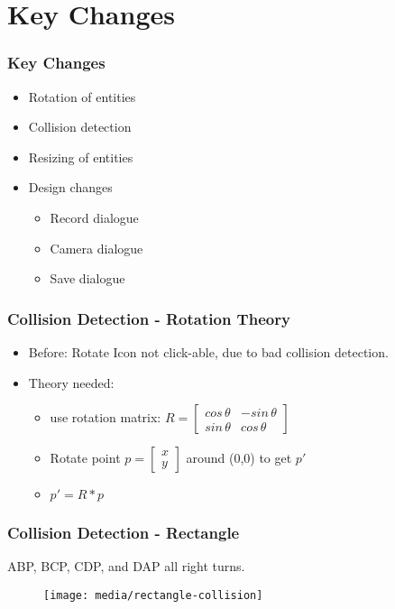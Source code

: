 

\section{Key Changes}
\begin{frame}
	\frametitle{Key Changes}
	\begin{itemize}
		\item Rotation of entities
		\item Collision detection
		\item Resizing of entities
		\item Design changes
		\begin{itemize}
			\item Record dialogue
			\item Camera dialogue
			\item Save dialogue
		\end{itemize}
	\end{itemize}
\end{frame}

\begin{frame}
	\frametitle{Collision Detection - Rotation Theory}
	\begin{itemize}
	\item Before: Rotate Icon not click-able, due to bad collision detection.
	\item Theory needed: 
	\begin{itemize}
	\item use rotation matrix: $R = \begin{bmatrix}
			cos\, \theta & - sin\, \theta\\
			sin\, \theta & cos\, \theta
			\end{bmatrix}$
	\item Rotate point $p = \begin{bmatrix}x\\y\end{bmatrix}$ around (0,0) to get $p'$
	\item $p' = R*p$
	\end{itemize}
	\end{itemize}
\end{frame}



\begin{frame}
	\frametitle{Collision Detection - Rectangle}
	ABP, BCP, CDP, and DAP all right turns.
		\begin{figure}
		\centering
			\texttt{[image: media/rectangle-collision]}
		\end{figure}
\end{frame}

